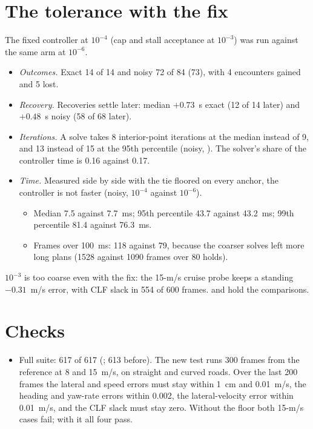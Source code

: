 \documentclass[11pt]{article}
\begin{document}
\section{The tolerance with the fix}
The fixed controller at $10^{-4}$ (cap and stall acceptance at
$10^{-3}$) was run against the same arm at $10^{-6}$.
\begin{itemize}
\item \emph{Outcomes.} Exact 14 of 14 and noisy 72 of 84 (73), with 4
  encounters gained and 5 lost.
\item \emph{Recovery.} Recoveries settle later: median $+0.73$~s exact
  (12 of 14 later) and $+0.48$~s noisy (58 of 68 later).
\item \emph{Iterations.} A solve takes 8 interior-point iterations at
  the median instead of 9, and 13 instead of 15 at the 95th percentile
  (noisy, ). The solver's share of the controller
  time is 0.16 against 0.17.
\item \emph{Time.} Measured side by side with the tie floored on every
  anchor, the controller is not faster (noisy, $10^{-4}$ against
  $10^{-6}$).
  \begin{itemize}
  \item Median 7.5 against 7.7~ms; 95th percentile 43.7 against 43.2~ms;
    99th percentile 81.4 against 76.3~ms.
  \item Frames over 100~ms: 118 against 79, because the coarser solves
    left more long plans (1528 against 1090 frames over 80 holds).
  \end{itemize}
\end{itemize}
$10^{-3}$ is too coarse even with the fix: the 15-m/s cruise probe keeps a
standing $-0.31$~m/s error, with CLF slack in 554 of 600 frames.
 and  hold the
comparisons.

\section{Checks}
\begin{itemize}
\item Full suite: 617 of 617 (; 613 before). The new test
   runs 300 frames
  from the reference at 8 and 15~m/s, on straight and curved roads. Over
  the last 200 frames the lateral and speed errors must stay within 1~cm
  and 0.01~m/s, the heading and yaw-rate errors within 0.002, the
  lateral-velocity error within 0.01~m/s, and the CLF slack must stay
  zero. Without the floor both 15-m/s cases fail; with it all four pass.
\end{itemize}
\end{document}
